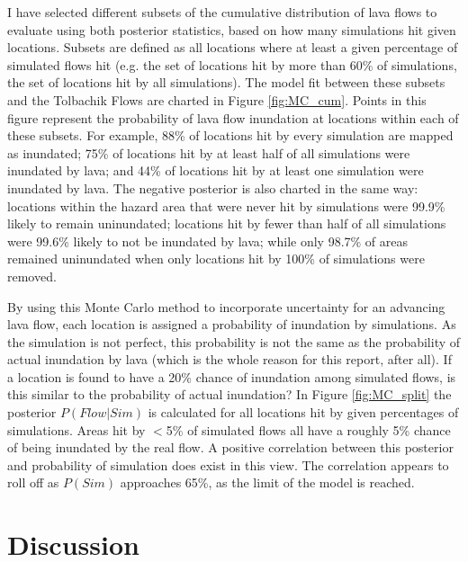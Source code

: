\documentclass[12pt,letter]{article}
\begin{document}
I have selected different subsets of the cumulative distribution of lava flows to evaluate using both posterior statistics, based on how many simulations hit given locations. Subsets are defined as all locations where at least a given percentage of simulated flows hit (e.g. the set of locations hit by more than 60\% of simulations, the set of locations hit by all simulations). The model fit between these subsets and the Tolbachik Flows are charted in Figure \ref{fig:MC_cum}. Points in this figure represent the probability of lava flow inundation at locations within each of these subsets. For example, 88\% of locations hit by every simulation are mapped as inundated; 75\% of locations hit by at least half of all simulations were inundated by lava; and 44\% of locations hit by at least one simulation were inundated by lava. The negative posterior is also charted in the same way: locations within the hazard area that were never hit by simulations were 99.9\% likely to remain uninundated; locations hit by fewer than half of all simulations were 99.6\% likely to not be inundated by lava; while only 98.7\% of areas remained uninundated when only locations hit by 100\% of simulations were removed.

By using this Monte Carlo method to incorporate uncertainty for an advancing lava flow, each location is assigned a probability of inundation by simulations. As the simulation is not perfect, this probability is not the same as the probability of actual inundation by lava (which is the whole reason for this report, after all). If a location is found to have a 20\% chance of inundation among simulated flows, is this similar to the probability of actual inundation? In Figure \ref{fig:MC_split} the posterior $P(Flow|Sim)$ is calculated for all locations hit by given percentages of simulations. Areas hit by $<$5\% of simulated flows all have a roughly 5\% chance of being inundated by the real flow. A positive correlation between this posterior and probability of simulation does exist in this view. The correlation appears to roll off as $P(Sim)$ approaches 65\%, as the limit of the model is reached.




\section{Discussion}\label{sec:discussion}
\end{document}
